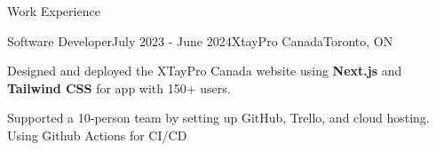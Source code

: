 \documentclass[
	11pt, %
]{resume} %
\begin{document}
\begin{rSection}{Work Experience}

	\begin{rSubsection}{Software Developer}{July 2023 - June 2024}{XtayPro Canada}{Toronto, ON}
		\item Designed and deployed the XTayPro Canada website using \textbf{Next.js} and \textbf{Tailwind CSS} for app with 150+ users.
		\item Supported a 10-person team by setting up GitHub, Trello, and cloud hosting. Using Github Actions for CI/CD
	\end{rSubsection}





\end{rSection}

\end{document}
